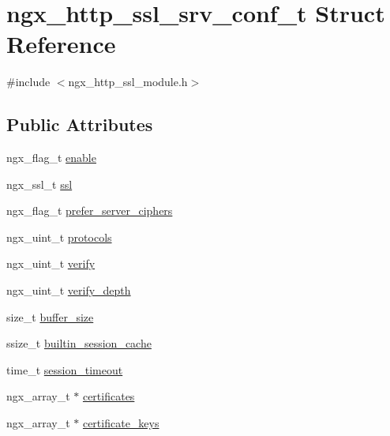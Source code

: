 \hypertarget{structngx__http__ssl__srv__conf__t}{\section{ngx\-\_\-http\-\_\-ssl\-\_\-srv\-\_\-conf\-\_\-t Struct Reference}
\label{structngx__http__ssl__srv__conf__t}
}


{\ttfamily \#include $<$ngx\-\_\-http\-\_\-ssl\-\_\-module.\-h$>$}

\subsection*{Public Attributes}
\begin{DoxyCompactItemize}
\item 
ngx\-\_\-flag\-\_\-t \hyperlink{structngx__http__ssl__srv__conf__t_a68b0e564e4ed3fdf905ccdb12c3a5546}{enable}
\item 
ngx\-\_\-ssl\-\_\-t \hyperlink{structngx__http__ssl__srv__conf__t_a0557f432e4d746612f66c6b3e3cdb435}{ssl}
\item 
ngx\-\_\-flag\-\_\-t \hyperlink{structngx__http__ssl__srv__conf__t_ab86b0e3fc651d8f2f5a4521cd5f914c6}{prefer\-\_\-server\-\_\-ciphers}
\item 
ngx\-\_\-uint\-\_\-t \hyperlink{structngx__http__ssl__srv__conf__t_a162bcaf3a07be001944e494ee9ac366a}{protocols}
\item 
ngx\-\_\-uint\-\_\-t \hyperlink{structngx__http__ssl__srv__conf__t_a61b6533eb0e54288ec5cd9ac83517b14}{verify}
\item 
ngx\-\_\-uint\-\_\-t \hyperlink{structngx__http__ssl__srv__conf__t_adce23a87cd5e4a717a8ee4d17fa945e4}{verify\-\_\-depth}
\item 
size\-\_\-t \hyperlink{structngx__http__ssl__srv__conf__t_afb896d7467c3bc2708ca5d7382d8779e}{buffer\-\_\-size}
\item 
ssize\-\_\-t \hyperlink{structngx__http__ssl__srv__conf__t_af592277549686060fa89e1f1db2efeb3}{builtin\-\_\-session\-\_\-cache}
\item 
time\-\_\-t \hyperlink{structngx__http__ssl__srv__conf__t_ad67962129ac4cb2f34c73efc86a4f5f5}{session\-\_\-timeout}
\item 
ngx\-\_\-array\-\_\-t $\ast$ \hyperlink{structngx__http__ssl__srv__conf__t_a3ccbb0c561aa24ad0e4a5001227f9b9b}{certificates}
\item 
ngx\-\_\-array\-\_\-t $\ast$ \hyperlink{structngx__http__ssl__srv__conf__t_a99b94a54f7d51cde0823f8582b4a7aad}{certificate\-\_\-keys}

\end{DoxyCompactItemize}
